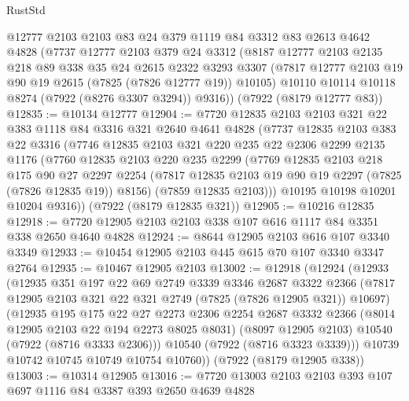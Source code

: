 \begin{lexlean}{RustStd}
\begin{coremodule}
    @12777
    @2103
    @2103
    @83
    @24
    @379
    @1119
    @84
    @3312
    @83
    @2613
    @4642
    @4828
    (@7737
      @12777
      @2103
      @379
      @24
      @3312
      (@8187
        @12777
        @2103
        @2135
        @218
        @89
        @338
        @35
        @24
        @2615
        @2322
        @3293
        @3307
        (@7817 @12777 @2103 @19 @90 @19 @2615 (@7825 (@7826 @12777 @19)) @10105)
        @10110
        @10114
        @10118
        @8274
        (@7922 (@8276 @3307 @3294))
        @9316))
    (@7922 (@8179 @12777 @83))
@12835 := @10134 @12777
@12904 := @7720
    @12835
    @2103
    @2103
    @321
    @22
    @383
    @1118
    @84
    @3316
    @321
    @2640
    @4641
    @4828
    (@7737
      @12835
      @2103
      @383
      @22
      @3316
      (@7746
        @12835
        @2103
        @321
        @220
        @235
        @22
        @2306
        @2299
        @2135
        @1176
        (@7760
          @12835
          @2103
          @220
          @235
          @2299
          (@7769
            @12835
            @2103
            @218
            @175
            @90
            @27
            @2297
            @2254
            (@7817 @12835 @2103 @19 @90 @19 @2297 (@7825 (@7826 @12835 @19)) @8156)
            (@7859 @12835 @2103)))
        @10195
        @10198
        @10201
        @10204
        @9316))
    (@7922 (@8179 @12835 @321))
@12905 := @10216 @12835
@12918 := @7720 @12905 @2103 @2103 @338 @107 @616 @1117 @84 @3351 @338 @2650 @4640 @4828
@12924 := @8644 @12905 @2103 @616 @107 @3340 @3349
@12933 := @10454 @12905 @2103 @445 @615 @70 @107 @3340 @3347 @2764
@12935 := @10467 @12905 @2103
@13002 := @12918
    (@12924
      (@12933
        (@12935
          @351
          @197
          @22
          @69
          @2749
          @3339
          @3346
          @2687
          @3322
          @2366
          (@7817 @12905 @2103 @321 @22 @321 @2749 (@7825 (@7826 @12905 @321)) @10697)
          (@12935
            @195
            @175
            @22
            @27
            @2273
            @2306
            @2254
            @2687
            @3332
            @2366
            (@8014 @12905 @2103 @22 @194 @2273 @8025 @8031)
            (@8097 @12905 @2103)
            @10540
            (@7922 (@8716 @3333 @2306)))
          @10540
          (@7922 (@8716 @3323 @3339)))
        @10739
        @10742
        @10745
        @10749
        @10754
        @10760))
    (@7922 (@8179 @12905 @338))
@13003 := @10314 @12905
@13016 := @7720 @13003 @2103 @2103 @393 @107 @697 @1116 @84 @3387 @393 @2650 @4639 @4828

\end{coremodule}
\end{lexlean}
